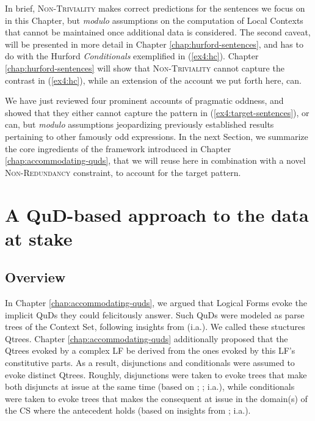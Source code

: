 In brief, \textsc{Non-Triviality} makes correct predictions for the sentences we focus on in this Chapter, but \textit{modulo} assumptions on the computation of Local Contexts that cannot be maintained once additional data is considered. The second caveat, will be presented in more detail in Chapter \ref{chap:hurford-sentences}, and has to do with the Hurford \textit{Conditionals} \parencite{Mandelkern2018} exemplified in (\ref{ex4:hc}). Chapter \ref{chap:hurford-sentences} will show that \textsc{Non-Triviality} cannot capture the contrast in (\ref{ex4:hc}), while an extension of the account we put forth here, can.

\begin{exe}
	\ex \label{ex4:hc}
	\begin{xlist}
		\label{ex4:hc-sw}
		\label{ex4:hc-ws}
	\end{xlist}
\end{exe}


We have just reviewed four prominent accounts of pragmatic oddness, and showed that they either cannot capture the pattern in (\ref{ex4:target-sentences}), or can, but \textit{modulo} assumptions jeopardizing previously established results pertaining to other famously odd expressions. In the next Section, we summarize the core ingredients of the framework introduced in Chapter \ref{chap:accommodating-quds}, that we will reuse here in combination with a novel \textsc{Non-Redundancy} constraint, to account for the target pattern.






\section{A QuD-based approach to the data at stake}\label{sec4:my-account}
\subsection{Overview}

In Chapter \ref{chap:accommodating-quds}, we argued that Logical Forms evoke the implicit QuDs they could felicitously answer. Such QuDs were modeled as parse trees of the Context Set, following insights from \textcite{Buring2003,Ippolito2019,Zhang2022} (i.a.). We called these stuctures Qtrees. Chapter \ref{chap:accommodating-quds} additionally proposed that the Qtrees evoked by a complex LF be derived from the ones evoked by this LF's constitutive parts. As a result, disjunctions and conditionals were assumed to evoke distinct Qtrees. Roughly, disjunctions were taken to evoke trees that make both disjuncts at issue at the same time (based on ; ;  i.a.), while conditionals were taken to evoke trees that makes the consequent at issue in the domain(s) of the CS where the antecedent holds (based on insights from ;  i.a.).\\

